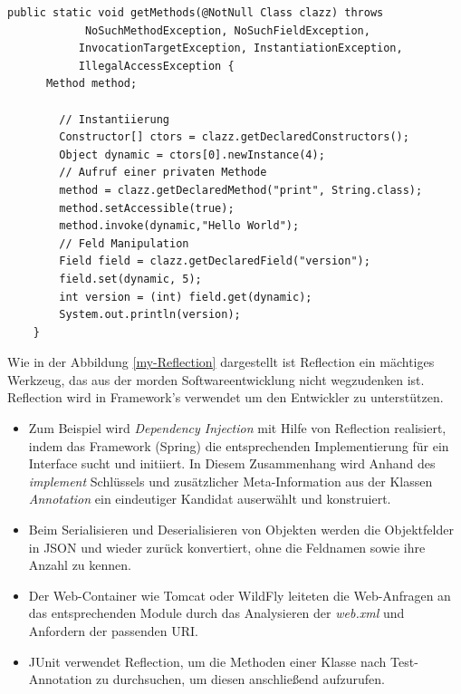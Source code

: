   \begin{lstlisting}[caption=Reflection in Aktion,label=my-Reflection,captionpos=b]
    public static void getMethods(@NotNull Class clazz) throws
            NoSuchMethodException, NoSuchFieldException,
           InvocationTargetException, InstantiationException,
           IllegalAccessException {
      Method method;

        // Instantiierung
        Constructor[] ctors = clazz.getDeclaredConstructors();
        Object dynamic = ctors[0].newInstance(4);
        // Aufruf einer privaten Methode
        method = clazz.getDeclaredMethod("print", String.class);
        method.setAccessible(true);
        method.invoke(dynamic,"Hello World");
        // Feld Manipulation
        Field field = clazz.getDeclaredField("version");
        field.set(dynamic, 5);
        int version = (int) field.get(dynamic);
        System.out.println(version);
    }
  \end{lstlisting}

  Wie in der Abbildung \ref{my-Reflection} dargestellt ist Reflection ein mächtiges Werkzeug, das aus der morden Softwareentwicklung nicht wegzudenken ist. Reflection wird in Framework's verwendet um den Entwickler zu unterstützen. 
  \begin{itemize}
    \item Zum Beispiel wird \textit{Dependency Injection} mit Hilfe von Reflection realisiert, indem das Framework (Spring) die entsprechenden Implementierung für ein Interface sucht und initiiert. In Diesem Zusammenhang wird Anhand des \textit{implement} Schlüssels und zusätzlicher Meta-Information aus der Klassen \textit{Annotation} ein eindeutiger Kandidat auserwählt und konstruiert.
    \item Beim Serialisieren und Deserialisieren von Objekten werden die Objektfelder in JSON und wieder zurück konvertiert, ohne die Feldnamen sowie ihre Anzahl zu kennen.
    \item Der Web-Container wie Tomcat oder WildFly leiteten die Web-Anfragen an das entsprechenden Module durch das Analysieren der \textit{web.xml} und Anfordern der passenden URI.
    \item JUnit verwendet Reflection, um die Methoden einer Klasse nach Test-Annotation zu durchsuchen, um diesen anschließend aufzurufen.
  \end{itemize}



